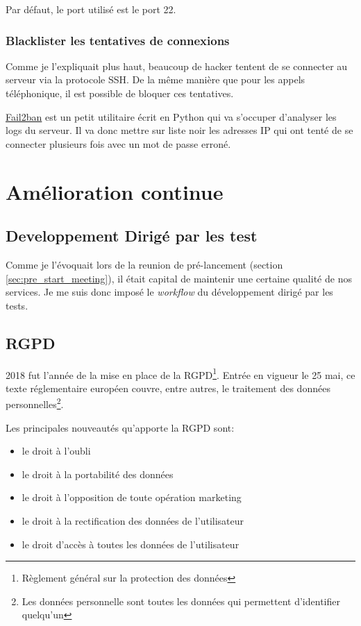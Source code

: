 \documentclass[]{report}
\begin{document}
      Par défaut, le port utilisé est le port 22.


    \subsection{Blacklister les tentatives de connexions}

      Comme je l'expliquait plus haut, beaucoup de hacker tentent de se connecter au serveur via la protocole SSH. De la même manière que pour les appels téléphonique, il est possible de bloquer ces tentatives.

       \href{https://www.fail2ban.org/wiki/index.php/Main_Page}{Fail2ban} est un petit utilitaire écrit en Python qui va s’occuper d'analyser les logs du serveur. Il va donc mettre sur liste noir les adresses IP qui ont tenté de se connecter plusieurs fois avec un mot de passe erroné.

\chapter{Amélioration continue}

  \section{Developpement Dirigé par les test}

    Comme je l'évoquait lors de la reunion de pré-lancement (section \ref{sec:pre_start_meeting}), il était capital de maintenir une certaine qualité de nos services. Je me suis donc imposé le \textit{workflow} du développement dirigé par les tests.




  \section{RGPD}

    2018 fut l'année de la mise en place de la RGPD\footnote{Règlement général sur la protection des données}. Entrée en vigueur le 25 mai, ce texte réglementaire européen couvre, entre autres, le traitement des données personnelles\footnote{Les données personnelle sont toutes les données qui permettent d'identifier quelqu'un}.

    Les principales nouveautés qu'apporte la RGPD sont:

    \begin{itemize}
      \item le droit à l'oubli
      \item le droit à la portabilité des données
      \item le droit à l'opposition de toute opération marketing
      \item le droit à la rectification des données de l'utilisateur
      \item le droit d'accès à toutes les données de l'utilisateur
    \end{itemize}
\end{document}
